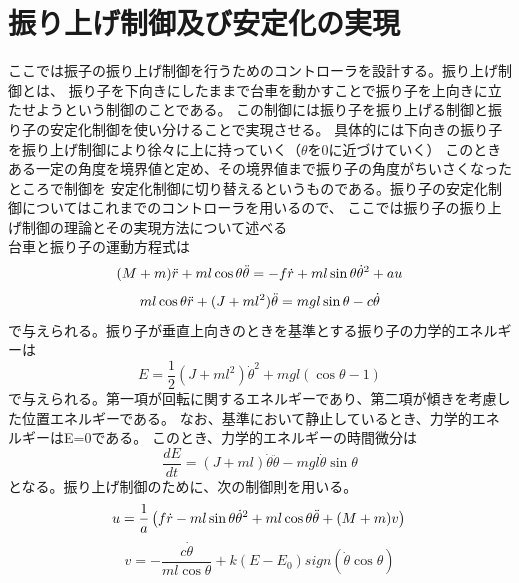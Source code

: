 \section{振り上げ制御及び安定化の実現}
	ここでは振子の振り上げ制御を行うためのコントローラを設計する。振り上げ制御とは、
	振り子を下向きにしたままで台車を動かすことで振り子を上向きに立たせようという制御のことである。
	この制御には振り子を振り上げる制御と振り子の安定化制御を使い分けることで実現させる。
	具体的には下向きの振り子を振り上げ制御により徐々に上に持っていく（$\theta$を0に近づけていく）
	このときある一定の角度を境界値と定め、その境界値まで振り子の角度がちいさくなったところで制御を
	安定化制御に切り替えるというものである。振り子の安定化制御についてはこれまでのコントローラを用いるので、
	ここでは振り子の振り上げ制御の理論とその実現方法について述べる\\
	台車と振り子の運動方程式は
	\begin{equation}
		(M+m)\ddot{r}+ml\cos{\theta}\ddot{\theta} = -f\dot{r} + ml\sin{\theta}\dot{\theta}^{2}+au\\
		\label{eq:huriage2}
	\end{equation}
	\begin{equation}
		ml\cos{\theta}\ddot{r}+(J+ml^{2})\ddot{\theta} = mgl\sin{\theta}-c\dot{\theta}\\
		\label{eq:huriage5}
	\end{equation}
	で与えられる。振り子が垂直上向きのときを基準とする振り子の力学的エネルギーは
	\begin{equation}
		E = \frac{1}{2}(J+ml^{2})\dot{\theta}^{2}+mgl(\cos{\theta}-1)
	\end{equation}
	で与えられる。第一項が回転に関するエネルギーであり、第二項が傾きを考慮した位置エネルギーである。
	なお、基準において静止しているとき、力学的エネルギーはE=0である。
	このとき、力学的エネルギーの時間微分は
	\begin{equation}
		\frac{dE}{dt} = (J+ml)\dot{\theta}\ddot{\theta}-mgl\dot{\theta}\sin{\theta}
		\label{eq:huriage6}
	\end{equation}
	となる。振り上げ制御のために、次の制御則を用いる。
	\begin{equation}
		u = \frac{1}{a}\left(f\dot{r} - ml\sin{\theta}\dot{\theta}^{2} + ml\cos{\theta}\ddot{\theta} + (M+m)v \right)\\
		\label{eq:huriage1}
	\end{equation}
	\begin{equation}
		v = -\frac{c\dot{\theta}}{ml\cos{\theta}}+k(E-E_{0})sign(\dot{\theta}\cos{\theta})
		\label{eq:huriage4}
	\end{equation}
